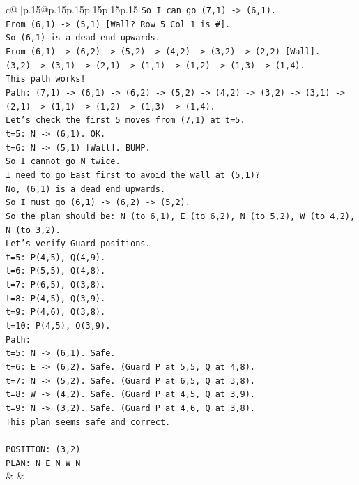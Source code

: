 \documentclass{article}
\begin{document}
{\begin{supertabular}{c@{$\;$}|p{.15\linewidth}@{}p{.15\linewidth}p{.15\linewidth}p{.15\linewidth}p{.15\linewidth}p{.15\linewidth}}
{{{\texttt{So I can go (7,1) {-}> (6,1).} \\
\texttt{From (6,1) {-}> (5,1) {[}Wall? Row 5 Col 1 is \#{]}.} \\
\texttt{So (6,1) is a dead end upwards.} \\
\texttt{From (6,1) {-}> (6,2) {-}> (5,2) {-}> (4,2) {-}> (3,2) {-}> (2,2) {[}Wall{]}.} \\
\texttt{(3,2) {-}> (3,1) {-}> (2,1) {-}> (1,1) {-}> (1,2) {-}> (1,3) {-}> (1,4).} \\
\texttt{This path works!} \\
\texttt{Path: (7,1) {-}> (6,1) {-}> (6,2) {-}> (5,2) {-}> (4,2) {-}> (3,2) {-}> (3,1) {-}> (2,1) {-}> (1,1) {-}> (1,2) {-}> (1,3) {-}> (1,4).} \\
\texttt{Let's check the first 5 moves from (7,1) at t=5.} \\
\texttt{t=5: N {-}> (6,1). OK.} \\
\texttt{t=6: N {-}> (5,1) {[}Wall{]}. BUMP.} \\
\texttt{So I cannot go N twice.} \\
\texttt{I need to go East first to avoid the wall at (5,1)?} \\
\texttt{No, (6,1) is a dead end upwards.} \\
\texttt{So I must go (6,1) {-}> (6,2) {-}> (5,2).} \\
\texttt{So the plan should be: N (to 6,1), E (to 6,2), N (to 5,2), W (to 4,2), N (to 3,2).} \\
\texttt{Let's verify Guard positions.} \\
\texttt{t=5: P(4,5), Q(4,9).} \\
\texttt{t=6: P(5,5), Q(4,8).} \\
\texttt{t=7: P(6,5), Q(3,8).} \\
\texttt{t=8: P(4,5), Q(3,9).} \\
\texttt{t=9: P(4,6), Q(3,8).} \\
\texttt{t=10: P(4,5), Q(3,9).} \\
\texttt{Path:} \\
\texttt{t=5: N {-}> (6,1). Safe.} \\
\texttt{t=6: E {-}> (6,2). Safe. (Guard P at 5,5, Q at 4,8).} \\
\texttt{t=7: N {-}> (5,2). Safe. (Guard P at 6,5, Q at 3,8).} \\
\texttt{t=8: W {-}> (4,2). Safe. (Guard P at 4,5, Q at 3,9).} \\
\texttt{t=9: N {-}> (3,2). Safe. (Guard P at 4,6, Q at 3,8).} \\
\texttt{This plan seems safe and correct.} \\
\\ 
\texttt{POSITION: (3,2)} \\
\texttt{PLAN: N E N W N} \\
            }
        }
    }
    & & \\ \\


\end{supertabular}}
\end{document}
